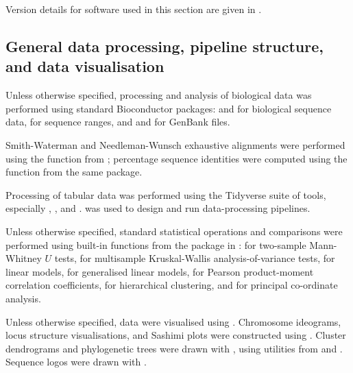 Version details for software used in this section are given in .

\subsection{General data processing, pipeline structure, and data visualisation}
\label{sec:methods_comp_general}

Unless otherwise specified, processing and analysis of biological data was performed using standard Bioconductor \parencite{huber2015bioconductor} packages:  \parencite{pages2017biostrings} and  \parencite{pages2018bsgenome} for biological sequence data,  \parencite{lawrence2013genomicranges} for sequence ranges, and  \parencite{becker2018genbankr} and  \parencite{winter2017rentrez} for GenBank files. 

Smith-Waterman and Needleman-Wunsch exhaustive alignments \parencite{needleman1970alignment,waterman1981alignment} were performed using the  function from ; percentage sequence identities were computed using the  function from the same package.

Processing of tabular data was performed using the Tidyverse suite of tools, especially  \parencite{wickham2018readr},  \parencite{wickham2018dplyr},  \parencite{wickham2018tidyr} and  \parencite{wickham2018stringr}.  \parencite{koster2012snakemake} was used to design and run data-processing pipelines.

Unless otherwise specified, standard statistical operations and comparisons were performed using built-in functions from the  package in  \parencite{rcore2018rcore}:  for two-sample Mann-Whitney $U$ tests,  for multisample Kruskal-Wallis analysis-of-variance tests,  for linear models,  for generalised linear models,  for Pearson product-moment correlation coefficients,  for hierarchical clustering, and  for principal co-ordinate analysis.

Unless otherwise specified, data were visualised using  \parencite{wickham2016ggplot2}. Chromosome ideograms, locus structure visualisations, and Sashimi plots \parencite{katz2013sashimi} were constructed using  \parencite{hahne2016gviz}. Cluster dendrograms and phylogenetic trees were drawn with  \parencite{guangchuang2018ggtree}, using utilities from  \parencite{paradis2018ape} and  \parencite{guangchuang2018tidytree}. Sequence logos were drawn with  \parencite{wagih2017ggseqlogo}. 

